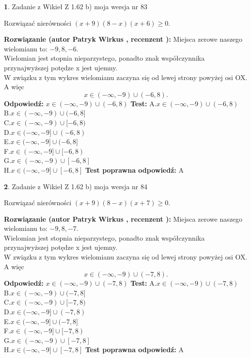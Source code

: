\documentclass[12pt, a4paper]{article}
\theoremstyle{definition} %
\newtheorem{zad}{}
\newcommand{\zadStart}[1]{\begin{zad}#1\newline}
\newcommand{\zadStop}{\end{zad}}
\newcommand{\rozwStart}[2]{\noindent \textbf{Rozwiązanie (autor #1 , recenzent #2): }\newline}
\newcommand{\rozwStop}{\newline}
\newcommand{\odpStart}{\noindent \textbf{Odpowiedź:}\newline}
\newcommand{\odpStop}{\newline}
\newcommand{\testStart}{\noindent \textbf{Test:}\newline}
\newcommand{\testStop}{\newline}
\newcommand{\kluczStart}{\noindent \textbf{Test poprawna odpowiedź:}\newline}
\newcommand{\kluczStop}{\newline}
\begin{document}
\zadStart{Zadanie z Wikieł Z 1.62 b) moja wersja nr 83}

Rozwiązać nierówności $(x+9)(8-x)(x+6)\ge0$.
\zadStop
\rozwStart{Patryk Wirkus}{}
Miejsca zerowe naszego wielomianu to: $-9, 8, -6$.\\
Wielomian jest stopnia nieparzystego, ponadto znak współczynnika przy\linebreak najwyższej potędze x jest ujemny.\\ W związku z tym wykres wielomianu zaczyna się od lewej strony powyżej osi OX. A więc $$x \in (-\infty,-9) \cup (-6,8).$$
\rozwStop
\odpStart
$x \in (-\infty,-9) \cup (-6,8)$
\odpStop
\testStart
A.$x \in (-\infty,-9) \cup (-6,8)$\\
B.$x \in (-\infty,-9) \cup (-6,8]$\\
C.$x \in (-\infty,-9) \cup [-6,8)$\\
D.$x \in (-\infty,-9] \cup (-6,8)$\\
E.$x \in (-\infty,-9] \cup (-6,8]$\\
F.$x \in (-\infty,-9] \cup [-6,8)$\\
G.$x \in (-\infty,-9) \cup [-6,8]$\\
H.$x \in (-\infty,-9] \cup [-6,8]$
\testStop
\kluczStart
A
\kluczStop



\zadStart{Zadanie z Wikieł Z 1.62 b) moja wersja nr 84}

Rozwiązać nierówności $(x+9)(8-x)(x+7)\ge0$.
\zadStop
\rozwStart{Patryk Wirkus}{}
Miejsca zerowe naszego wielomianu to: $-9, 8, -7$.\\
Wielomian jest stopnia nieparzystego, ponadto znak współczynnika przy\linebreak najwyższej potędze x jest ujemny.\\ W związku z tym wykres wielomianu zaczyna się od lewej strony powyżej osi OX. A więc $$x \in (-\infty,-9) \cup (-7,8).$$
\rozwStop
\odpStart
$x \in (-\infty,-9) \cup (-7,8)$
\odpStop
\testStart
A.$x \in (-\infty,-9) \cup (-7,8)$\\
B.$x \in (-\infty,-9) \cup (-7,8]$\\
C.$x \in (-\infty,-9) \cup [-7,8)$\\
D.$x \in (-\infty,-9] \cup (-7,8)$\\
E.$x \in (-\infty,-9] \cup (-7,8]$\\
F.$x \in (-\infty,-9] \cup [-7,8)$\\
G.$x \in (-\infty,-9) \cup [-7,8]$\\
H.$x \in (-\infty,-9] \cup [-7,8]$
\testStop
\kluczStart
A
\kluczStop
\end{document}
